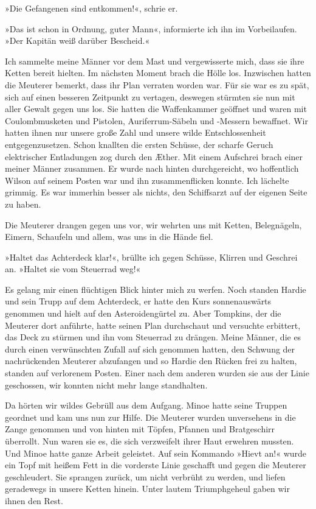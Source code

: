»Die Gefangenen sind entkommen!«, schrie er.

»Das ist schon in Ordnung, guter Mann«, informierte ich ihn im
Vorbeilaufen. »Der Kapitän weiß darüber Bescheid.«

\bigpar

Ich sammelte meine Männer vor dem Mast und vergewisserte mich, dass
sie ihre Ketten bereit hielten. Im nächsten Moment brach die Hölle
los. Inzwischen hatten die Meuterer bemerkt, dass ihr Plan verraten
worden war. Für sie war es zu spät, sich auf einen besseren
Zeitpunkt zu vertagen, deswegen stürmten sie nun mit aller Gewalt
gegen uns los. Sie hatten die Waffenkammer geöffnet und waren mit
Coulombmusketen und Pistolen, Auriferrum-Säbeln und -Messern
bewaffnet. Wir hatten ihnen nur unsere große Zahl und unsere wilde
Entschlossenheit entgegenzusetzen. Schon knallten die ersten
Schüsse, der scharfe Geruch elektrischer Entladungen zog durch den
Æther. Mit einem Aufschrei brach einer meiner Männer zusammen. Er
wurde nach hinten durchgereicht, wo hoffentlich Wilson auf seinem
Posten war und ihn zusammenflicken konnte. Ich lächelte grimmig. Es
war immerhin besser als nichts, den Schiffsarzt auf der eigenen
Seite zu haben.

Die Meuterer drangen gegen uns vor, wir wehrten uns mit Ketten,
Belegnägeln, Eimern, Schaufeln und allem, was uns in die Hände
fiel.

»Haltet das Achterdeck klar!«, brüllte ich gegen Schüsse, Klirren
und Geschrei an. »Haltet sie vom Steuerrad weg!«

Es gelang mir einen flüchtigen Blick hinter mich zu werfen. Noch
standen Hardie und sein Trupp auf dem Achterdeck, er hatte den Kurs
sonnenauswärts genommen und hielt auf den Asteroidengürtel zu. Aber
Tompkins, der die Meuterer dort anführte, hatte seinen Plan
durchschaut und versuchte erbittert, das Deck zu stürmen und ihn
vom Steuerrad zu drängen. Meine Männer, die es durch einen
verwünschten Zufall auf sich genommen hatten, den Schwung der
nachrückenden Meuterer abzufangen und so Hardie den Rücken frei zu
halten, standen auf verlorenem Posten. Einer nach dem anderen
wurden sie aus der Linie geschossen, wir konnten nicht mehr lange
standhalten.

Da hörten wir wildes Gebrüll aus dem Aufgang. Minoe hatte seine
Truppen geordnet und kam uns nun zur Hilfe. Die Meuterer wurden
unversehens in die Zange genommen und von hinten mit Töpfen,
Pfannen und Bratgeschirr überrollt. Nun waren sie es, die sich
verzweifelt ihrer Haut erwehren mussten. Und Minoe hatte ganze
Arbeit geleistet. Auf sein Kommando »Hievt an!« wurde ein Topf mit
heißem Fett in die vorderste Linie geschafft und gegen die Meuterer
geschleudert. Sie sprangen zurück, um nicht verbrüht zu werden, und
liefen geradewegs in unsere Ketten hinein. Unter lautem
Triumphgeheul gaben wir ihnen den Rest.

